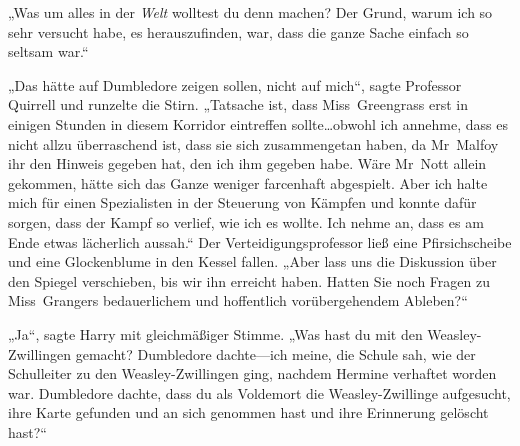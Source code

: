 „Was um alles in der \emph{Welt} wolltest du denn machen? Der Grund, warum ich so sehr versucht habe, es herauszufinden, war, dass die ganze Sache einfach so seltsam war.“

„Das hätte auf Dumbledore zeigen sollen, nicht auf mich“, sagte Professor Quirrell und runzelte die Stirn.
„Tatsache ist, dass Miss~Greengrass erst in einigen Stunden in diesem Korridor eintreffen sollte…obwohl ich annehme, dass es nicht allzu überraschend ist, dass sie sich zusammengetan haben, da Mr~Malfoy ihr den Hinweis gegeben hat, den ich ihm gegeben habe. Wäre Mr~Nott allein gekommen, hätte sich das Ganze weniger farcenhaft abgespielt. Aber ich halte mich für einen Spezialisten in der Steuerung von Kämpfen und konnte dafür sorgen, dass der Kampf so verlief, wie ich es wollte. Ich nehme an, dass es am Ende etwas lächerlich aussah.“
Der Verteidigungsprofessor ließ eine Pfirsichscheibe und eine Glockenblume in den Kessel fallen.
„Aber lass uns die Diskussion über den Spiegel verschieben, bis wir ihn erreicht haben. Hatten Sie noch Fragen zu Miss~Grangers bedauerlichem und hoffentlich vorübergehendem Ableben?“

„Ja“, sagte Harry mit gleichmäßiger Stimme. „Was hast du mit den Weasley-Zwillingen gemacht? Dumbledore dachte—ich meine, die Schule sah, wie der Schulleiter zu den Weasley-Zwillingen ging, nachdem Hermine verhaftet worden war. Dumbledore dachte, dass du als Voldemort die Weasley-Zwillinge aufgesucht, ihre Karte gefunden und an sich genommen hast und ihre Erinnerung gelöscht hast?“

